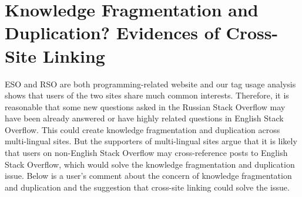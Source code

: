 \section{Knowledge Fragmentation and Duplication? Evidences of Cross-Site Linking}

ESO and RSO are both programming-related website and our tag usage analysis shows that users of the two sites share much common interests.
Therefore, it is reasonable that some new questions asked in the Russian Stack Overflow may have been already answered or have highly related questions in English Stack Overflow.
This could create knowledge fragmentation and duplication across multi-lingual sites.
But the supporters of multi-lingual sites argue that it is likely that users on non-English Stack Overflow may cross-reference posts to English Stack Overflow, which would solve the knowledge fragmentation and duplication issue.
Below is a user's comment about the concern of knowledge fragmentation and duplication and the suggestion that cross-site linking could solve the issue.	


